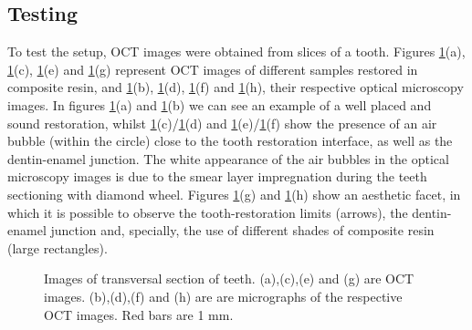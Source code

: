 \documentclass[12pt,twoside,english]{book}
\renewcommand{\~}{\perispomeni}%
\numberwithin{equation}{section}
\numberwithin{figure}{section}
\begin{document}
\subsection{Testing}

To test the setup, OCT images were obtained from slices of a tooth. Figures \ref{fig:SROCT2 test}(a), \ref{fig:SROCT2 test}(c), \ref{fig:SROCT2 test}(e) and \ref{fig:SROCT2 test}(g) represent OCT images of different samples restored in composite resin, and \ref{fig:SROCT2 test}(b), \ref{fig:SROCT2 test}(d), \ref{fig:SROCT2 test}(f) and \ref{fig:SROCT2 test}(h), their respective optical microscopy images. In figures \ref{fig:SROCT2 test}(a) and \ref{fig:SROCT2 test}(b) we can see an example of a well placed and sound restoration, whilst \ref{fig:SROCT2 test}(c)/\ref{fig:SROCT2 test}(d) and \ref{fig:SROCT2 test}(e)/\ref{fig:SROCT2 test}(f) show the presence of an air bubble (within the circle) close to the tooth restoration interface, as well as the dentin-enamel junction. The white appearance of the air bubbles in the optical microscopy images is due to the smear layer impregnation during the teeth sectioning with diamond wheel. Figures \ref{fig:SROCT2 test}(g) and \ref{fig:SROCT2 test}(h) show an aesthetic facet, in which it is possible to observe the tooth-restoration limits (arrows), the dentin-enamel junction and, specially, the use of different shades of composite resin (large rectangles).

%
\begin{figure}[]
\noindent \begin{centering}

\caption{Images of transversal section of teeth. (a),(c),(e) and (g) are OCT images. (b),(d),(f) and (h) are are micrographs of the respective OCT images. Red bars are 1 mm.}
\label{fig:SROCT2 test}
\par\end{centering}
\end{figure}
\end{document}
